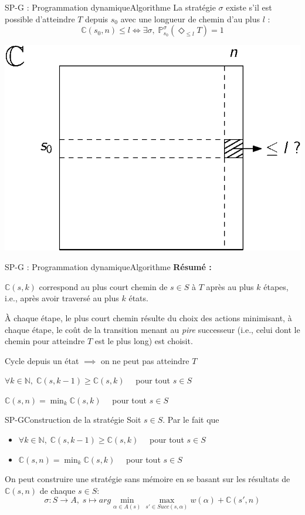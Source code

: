 \documentclass[compress]{beamer}
\theoremstyle{theorem}%
\begin{document}
\begin{frame}{SP-G : Programmation dynamique}{Algorithme}
La stratégie $\sigma$ existe s'il est possible d'atteindre $T$ depuis $s_0$ avec une longueur
de chemin d'au plus $l$ :
\[
  \mathbb{C}(s_0, n) \leq l \iff \exists \sigma, \; \mathbb{P}_{s_0}^\sigma(\Diamond_{\leq l} T) = 1
\]
\begin{center}
  \includegraphics[width=0.4\linewidth]{resources/sp-g2}
\end{center}
\end{frame}

\begin{frame}{SP-G : Programmation dynamique}{Algorithme}
  \textbf{\color{fibeamer@orange}Résumé :}
  \begin{itemize}
    \item $\mathbb{C}(s, k)$ correspond au plus court chemin de $s \in S$ à $T$ après \alert{au plus} $k$ étapes, i.e., après avoir traversé \alert{au plus} $k$ états.
    \item \`A chaque étape, le plus court chemin résulte du choix des actions minimisant, à chaque étape, le coût de la transition menant au \textit{pire} successeur (i.e., celui dont le chemin pour atteindre $T$ est le plus long) est choisit.
    \item Cycle depuis un état $\implies$ on ne peut pas atteindre $T$
    { \color{fibeamer@blue}
    \item $\forall k \in \mathbb{N}, \; \mathbb{C}(s, k-1) \geq \mathbb{C}(s, k)\quad$ pour tout $s \in S$
    \item $\mathbb{C}(s, n) = \min_k \mathbb{C}(s, k)\quad$ pour tout $s \in S$
    }
  \end{itemize}
\end{frame}

\begin{frame}{SP-G}{Construction de la stratégie}
Soit $s \in S$. Par le fait que
\begin{itemize}
    \item $\forall k \in \mathbb{N}, \; \mathbb{C}(s, k-1) \geq \mathbb{C}(s, k)\quad$ pour tout $s \in S$
    \item $\mathbb{C}(s, n) = \min_k \mathbb{C}(s, k)\quad$ pour tout $s \in S$
\end{itemize}
On peut construire une stratégie sans mémoire en se basant sur les résultats de $\mathbb{C}(s, n)$ de chaque $s \in S$:
\[
  \sigma : S \rightarrow A, \; s \mapsto arg \min_{\alpha \in A(s)} \max_{s' \in Succ(s, \alpha)} w(\alpha) + \mathbb{C}(s', n)
\]
\end{frame}
\end{document}

